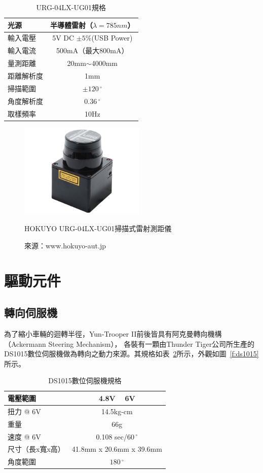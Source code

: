 \begin{table}[h!]
	\centering
	\caption{URG-04LX-UG01規格}
	\label{t:urg-specs}
	\begin{tabular}{| l | c |}
		\hline
		光源 & 半導體雷射（$\lambda = 785nm$） \\ \hline
		輸入電壓 & 5V DC $\pm 5\%$(USB Power) \\ \hline
		輸入電流 & 500mA（最大800mA） \\ \hline
		量測距離 & 20mm$\sim$4000mm \\ \hline
		距離解析度 & 1mm \\ \hline
		掃描範圍 & $\pm 120\,^{\circ}$ \\ \hline
		角度解析度 & $0.36\,^{\circ}$ \\ \hline
		取樣頻率 & 10Hz \\
		\hline
	\end{tabular}
\end{table}

\begin{figure}[h!]
	\centering
	\includegraphics[width=6cm]{figures/URG-04LX-UG01}
	\caption{HOKUYO URG-04LX-UG01掃描式雷射測距儀}
	\caption*{來源：www.hokuyo-aut.jp}
	\label{f:urg}
\end{figure}

\section{驅動元件}

\subsection{轉向伺服機}
為了縮小車輛的迴轉半徑，Yun-Trooper II前後皆具有阿克曼轉向機構（Ackermann Steering Mechanism），
各裝有一顆由Thunder Tiger公司所生產的DS1015數位伺服機做為轉向之動力來源。其規格如表~\ref{t:ds1015-specs}所示，外觀如圖~\ref{f:ds1015}所示。

\begin{table}[h!]
	\centering
	\caption{DS1015數位伺服機規格}
	\label{t:ds1015-specs}
	\begin{tabular}{ | l | c |}
		\hline
		電壓範圍 & 4.8V ~ 6V \\ \hline
		扭力 @ 6V & 14.5kg-cm \\ \hline
		重量 & 66g \\ \hline
		速度 @ 6V & 0.108 sec/$60\,^{\circ}$ \\ \hline
		尺寸（長x寬x高） & 41.8mm x 20.6mm x 39.6mm \\ \hline
		角度範圍 & $180\,^{\circ}$ \\
		\hline
	\end{tabular}
\end{table}

